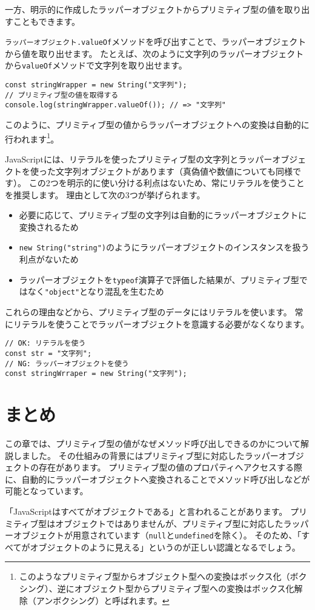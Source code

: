 一方、明示的に作成したラッパーオブジェクトからプリミティブ型の値を取り出すこともできます。

\texttt{ラッパーオブジェクト.valueOf}メソッドを呼び出すことで、ラッパーオブジェクトから値を取り出せます。
たとえば、次のように文字列のラッパーオブジェクトから\texttt{valueOf}メソッドで文字列を取り出せます。

\begin{lstlisting}
const stringWrapper = new String("文字列");
// プリミティブ型の値を取得する
console.log(stringWrapper.valueOf()); // => "文字列"
\end{lstlisting}

このように、プリミティブ型の値からラッパーオブジェクトへの変換は自動的に行われます\footnote{このようなプリミティブ型からオブジェクト型への変換はボックス化（ボクシング）、逆にオブジェクト型からプリミティブ型への変換はボックス化解除（アンボクシング）と呼ばれます。}。

JavaScriptには、リテラルを使ったプリミティブ型の文字列とラッパーオブジェクトを使った文字列オブジェクトがあります（真偽値や数値についても同様です）。
この2つを明示的に使い分ける利点はないため、常にリテラルを使うことを推奨します。
理由として次の3つが挙げられます。

\begin{itemize}
\item
  必要に応じて、プリミティブ型の文字列は自動的にラッパーオブジェクトに変換されるため
\item
  \texttt{new String("string")}のようにラッパーオブジェクトのインスタンスを扱う利点がないため
\item
  ラッパーオブジェクトを\texttt{typeof}演算子で評価した結果が、プリミティブ型ではなく\texttt{"object"}となり混乱を生むため
\end{itemize}

これらの理由などから、プリミティブ型のデータにはリテラルを使います。
常にリテラルを使うことでラッパーオブジェクトを意識する必要がなくなります。

\begin{lstlisting}
// OK: リテラルを使う
const str = "文字列";
// NG: ラッパーオブジェクトを使う
const stringWrraper = new String("文字列");
\end{lstlisting}

\hypertarget{wrapper-object-summary}{%
\section{まとめ}\label{wrapper-object-summary}}

この章では、プリミティブ型の値がなぜメソッド呼び出しできるのかについて解説しました。
その仕組みの背景にはプリミティブ型に対応したラッパーオブジェクトの存在があります。
プリミティブ型の値のプロパティへアクセスする際に、自動的にラッパーオブジェクトへ変換されることでメソッド呼び出しなどが可能となっています。

「JavaScriptはすべてがオブジェクトである」と言われることがあります。
プリミティブ型はオブジェクトではありませんが、プリミティブ型に対応したラッパーオブジェクトが用意されています（\texttt{null}と\texttt{undefined}を除く）。
そのため、「すべてがオブジェクトのように見える」というのが正しい認識となるでしょう。
